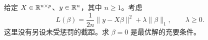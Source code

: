 给定 $X\in\mathbb{R}^{n\times p}$、$y\in\mathbb{R}^n$，其中 $n\ge1$。考虑
\[
 L(\beta)=\frac1{2n}\|y-X\beta\|^2+\lambda\|\beta\|_1,
 \qquad \lambda\ge0.
\]
这里没有另设未受惩罚的截距。求 $\beta=0$ 是最优解的充要条件。
